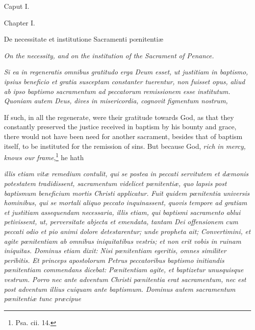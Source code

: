Caput I.

Chapter I.

De necessitate et institutione Sacramenti pœnitentiæ

\emph{On the necessity, and on the institution of the Sacrament of Penance.}

\emph{Si ea in regeneratis omnibus gratitudo erga Deum esset, ut justitiam in baptismo, ipsius beneficio et gratia susceptam constanter tuerentur, non fuisset opus, aliud ab ipso baptismo sacramentum ad peccatorum remissionem esse institutum. Quoniam autem Deus, dives in misericordia, cognovit figmentum nostrum, }

If such, in all the regenerate, were their gratitude towards God, as that they constantly preserved the justice received in baptism by his bounty and grace, there would not have been need for another sacrament, besides that of baptism itself, to be instituted for the remission of sins. But because God, \emph{rich in mercy, knows our frame},\footnote{\par   Psa. cii. 14.} he hath

\emph{illis etiam vitæ remedium contulit, qui se postea in peccati servitutem et dæmonis potestatem tradidissent, sacramentum videlicet pœnitentiæ, quo lapsis post baptismum beneficium mortis Christi applicatur. Fuit quidem pœnitentia universis hominibus, qui se mortali aliquo peccato inquinassent, quovis tempore ad gratiam et justitiam assequendam necessaria, illis etiam, qui baptismi sacramento ablui petivissent, ut, perversitate abjecta et emendata, tantam Dei offensionem cum peccati odio et pio animi dolore detestarentur; unde propheta ait; Convertimini, et agite pœnitentiam ab omnibus iniquitatibus vestris; et non erit vobis in ruinam iniquitas. Dominus etiam dixit: Nisi pœnitentiam egeritis, omnes similiter peribitis. Et princeps apostolorum Petrus peccatoribus baptismo initiandis pœnitentiam commendans dicebat: Pœnitentiam agite, et baptizetur unusquisque vestrum. Porro nec ante adventum Christi pœnitentia erat sacramentum, nec est post adventum illius cuiquam ante baptismum. Dominus autem sacramentum pœnitentiæ tunc præcipue }

